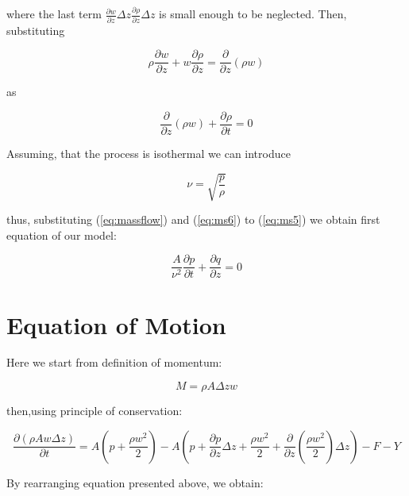where the last term $\frac{\partial w}{\partial z} \Delta z  \frac{\partial \rho}{\partial z} \Delta z$ is small enough to be neglected. Then, substituting

\begin{equation}
\label{eq:ms4}
\rho \frac{\partial w}{\partial z} +w \frac{\partial \rho}{\partial z} = \frac{\partial}{\partial z} \left( \rho w \right)
\end{equation}

as

\begin{equation}
\label{eq:ms5}
\frac{\partial}{\partial z} \left( \rho w \right) + \frac{\partial \rho}{\partial t} = 0
\end{equation}

Assuming, that the process is isothermal we can introduce

\begin{equation}
\label{eq:ms6}
\nu = \sqrt{\frac{p}{\rho}}
\end{equation}

thus, substituting (\ref{eq:massflow}) and (\ref{eq:ms6}) to (\ref{eq:ms5}) we obtain first equation of our model:

\begin{equation}
\label{eq:cont_fin3}
\frac{A}{\nu^2} \frac{\partial p}{\partial t} + \frac{\partial q}{\partial z} = 0
\end{equation}


\section{Equation of Motion}

Here we start from definition of momentum:

\begin{equation}
\label{eq:mm1}
M = \rho A \Delta z w
\end{equation}

then,using principle of conservation:

\begin{equation}
\label{eq:mm2}
\frac{\partial \left( \rho A w \Delta z \right)}{\partial t} = A \left(p + \frac{\rho w^2}{2} \right) - A\left(p + \frac{\partial p}{\partial z} \Delta z + \frac{\rho w^2}{2} + \frac{\partial}{\partial z} \left( \frac{\rho w^2}{2} \right) \Delta z \right) - F - Y
\end{equation}

By rearranging equation presented above, we obtain:

